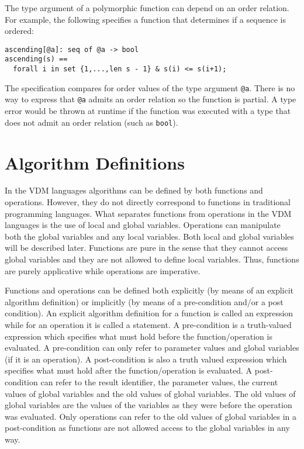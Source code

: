 \documentclass{overturerepchap}
\begin{document}
\begin{description}
The type argument of a polymorphic function can depend on an order relation.
For example, the following specifies a function that determines if a sequence is ordered:
\begin{lstlisting}
ascending[@a]: seq of @a -> bool
ascending(s) ==
  forall i in set {1,...,len s - 1} & s(i) <= s(i+1);
\end{lstlisting}

The specification compares for order values of the type argument {\tt @a}. There is no way to express that {\tt @a} admits an order relation so the function is partial. 
A type error would be thrown at runtime if the function was executed with a type that does not admit an order relation (such as {\tt bool}).
\end{description}

\chapter{Algorithm Definitions}
\label{algorithm}


In the VDM languages algorithms can be defined by both
functions and operations.  However, they do not directly correspond to
functions in traditional programming languages. What separates
functions from operations in the VDM languages is the use of
local and global variables. Operations can manipulate both the global
variables and any local variables.  Both
local and global variables will be described later. Functions are pure in
the sense that they cannot access global variables and they are not
allowed to define local variables. Thus, functions are purely
applicative while operations are imperative.

Functions and operations can be defined both explicitly (by means of
an explicit algorithm definition) or implicitly (by means of a
pre-condition and/or a post condition).  An explicit algorithm
definition for a function is called an expression while for an
operation it is called a statement.  A pre-condition is a truth-valued
expression which specifies what must hold before the
function/operation is evaluated. A pre-condition can only refer to
parameter values and global variables (if it is an operation).  A
post-condition is also a truth valued expression which specifies what
must hold after the function/operation is evaluated. A post-condition
can refer to the result identifier, the parameter values, the current
values of global variables and the old values of global variables. The
old values of global variables are the values of the variables as they
were before the operation was evaluated.  Only operations can refer to
the old values of global variables in a post-condition as functions
are not allowed access to the global variables in any way.
\end{document}

